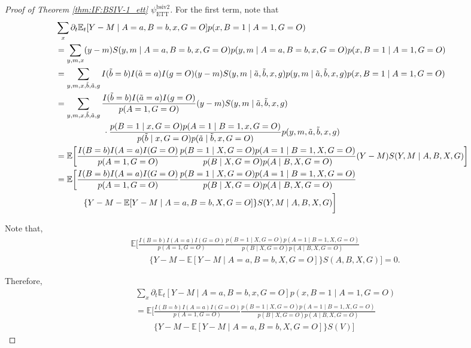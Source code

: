 \documentclass[10pt]{article}
\begin{document}
\begin{proof}[Proof of Theorem \ref{thm:IF:BSIV-1_ett} $\psi_{\text{ETT}}^{\text{bsiv2}}$]
For the first term, note that
{\footnotesize \begin{align*}
    &\sum_{x}\partial_t\mathbb{E}_t[Y-M\mid A=a,B=b,x,G=O]p(x,B=1\mid A=1, G=O)\\
    &=\sum_{y,m,x}(y-m)S(y,m\mid A=a,B=b,x,G=O)p(y,m\mid A=a,B=b,x,G=O)p(x,B=1\mid A=1, G=O)\\
    &=\sum_{y,m,x,\Tilde{b},\Tilde{a},g}I(\Tilde{b}=b)I(\Tilde{a}=a)I(g=O)(y-m)S(y,m\mid \Tilde{a},\Tilde{b},x,g)p(y,m\mid \Tilde{a},\Tilde{b},x,g)p(x,B=1\mid A=1, G=O)\\
    &=\sum_{y,m,x,\Tilde{b},\Tilde{a},g}\frac{I(\Tilde{b}=b)I(\Tilde{a}=a)I(g=O)}{p(A=1,G=O)}(y-m)S(y,m\mid \Tilde{a},\Tilde{b},x,g)\\
    &~~~~~~~~~~~~~~~~~\cdot \frac{p(B=1\mid x,G=O)p(A=1\mid B=1, x, G=O)}{p(\Tilde{b}\mid x,G=O)p(\Tilde{a}\mid\Tilde{b},x,G=O)}p(y,m, \Tilde{a},\Tilde{b},x,g)\\
    &=\mathbb{E}\bigg[\frac{I(B=b)I(A=a)I(G=O)}{p(A=1,G=O)}\frac{p(B=1\mid X,G=O)p(A=1\mid B=1, X, G=O)}{p(B\mid X,G=O)p(A\mid B, X,G=O)}(Y-M)S(Y,M\mid A,B,X,G)\bigg]\\
    &=\mathbb{E}\bigg[\frac{I(B=b)I(A=a)I(G=O)}{p(A=1,G=O)}\frac{p(B=1\mid X,G=O)p(A=1\mid B=1, X, G=O)}{p(B\mid X,G=O)p(A\mid B, X,G=O)}\\
    &\ \ \ \ \ \ \ \ \ \ \{Y-M-\mathbb{E}[Y-M\mid A=a,B=b,X,G=O]\}S(Y,M\mid A,B,X,G)\bigg]
\end{align*}}

Note that,
\begin{align*}
    &\mathbb{E}\bigg[\frac{I(B=b)I(A=a)I(G=O)}{p(A=1,G=O)}\frac{p(B=1\mid X,G=O)p(A=1\mid B=1, X, G=O)}{p(B\mid X,G=O)p(A\mid B, X,G=O)}\\
    &\ \ \ \ \ \ \ \ \ \ \{Y-M-\mathbb{E}[Y-M\mid A=a,B=b,X,G=O]\}S(A,B,X,G)\bigg]=0.
\end{align*}

Therefore,
\begin{align*}
    &\sum_{x}\partial_t\mathbb{E}_t[Y-M\mid A=a,B=b,x,G=O]p(x,B=1\mid A=1, G=O)\\
    &=\mathbb{E}\bigg[\frac{I(B=b)I(A=a)I(G=O)}{p(A=1,G=O)}\frac{p(B=1\mid X,G=O)p(A=1\mid B=1, X, G=O)}{p(B\mid X,G=O)p(A\mid B, X,G=O)}\\
    &\ \ \ \ \ \ \ \ \ \ \{Y-M-\mathbb{E}[Y-M\mid A=a,B=b,X,G=O]\}S(V)\bigg]
\end{align*}


\end{proof}
\end{document}
